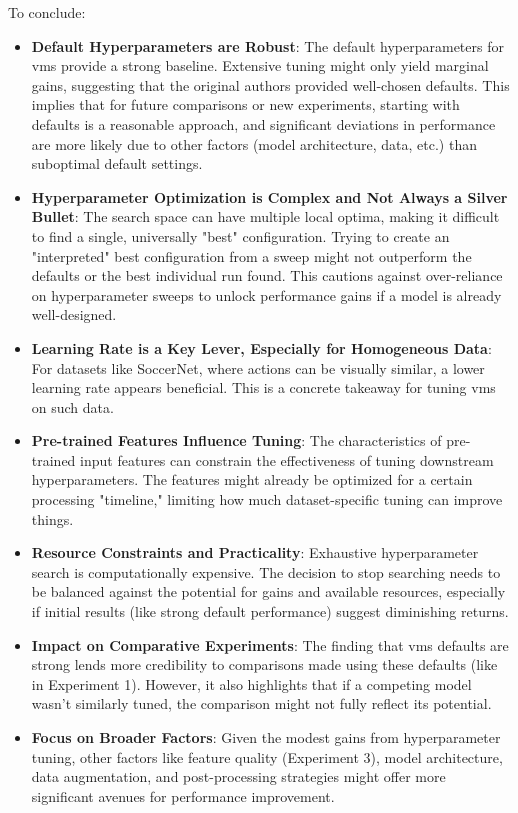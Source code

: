 To conclude:
\begin{itemize}
    \item \textbf{Default Hyperparameters are Robust}: The default hyperparameters for \acrshort{vms} provide a strong baseline. Extensive tuning might only yield marginal gains, suggesting that the original authors provided well-chosen defaults. This implies that for future comparisons or new experiments, starting with defaults is a reasonable approach, and significant deviations in performance are more likely due to other factors (model architecture, data, etc.) than suboptimal default settings.
    \item \textbf{Hyperparameter Optimization is Complex and Not Always a Silver Bullet}: The search space can have multiple local optima, making it difficult to find a single, universally "best" configuration. Trying to create an "interpreted" best configuration from a sweep might not outperform the defaults or the best individual run found. This cautions against over-reliance on hyperparameter sweeps to unlock performance gains if a model is already well-designed.
    \item \textbf{Learning Rate is a Key Lever, Especially for Homogeneous Data}: For datasets like SoccerNet, where actions can be visually similar, a lower learning rate appears beneficial. This is a concrete takeaway for tuning \acrshort{vms} on such data.
    \item \textbf{Pre-trained Features Influence Tuning}: The characteristics of pre-trained input features can constrain the effectiveness of tuning downstream hyperparameters. The features might already be optimized for a certain processing "timeline," limiting how much dataset-specific tuning can improve things.
    \item \textbf{Resource Constraints and Practicality}: Exhaustive hyperparameter search is computationally expensive. The decision to stop searching needs to be balanced against the potential for gains and available resources, especially if initial results (like strong default performance) suggest diminishing returns.
    \item \textbf{Impact on Comparative Experiments}: The finding that \acrshort{vms} defaults are strong lends more credibility to comparisons made using these defaults (like in Experiment 1). However, it also highlights that if a competing model wasn't similarly tuned, the comparison might not fully reflect its potential.
    \item \textbf{Focus on Broader Factors}: Given the modest gains from hyperparameter tuning, other factors like feature quality (Experiment 3), model architecture, data augmentation, and post-processing strategies might offer more significant avenues for performance improvement.
\end{itemize}


